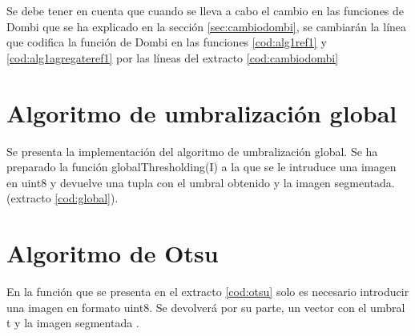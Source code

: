 \documentclass[main]{subfiles}
\begin{document}
\bgroup
{}
\egroup

\bgroup
{}
\egroup

\newpage

\bgroup
{}
\egroup

Se debe tener en cuenta que cuando se lleva a cabo el cambio en las funciones de Dombi que se ha explicado en la sección \ref{sec:cambiodombi}, se cambiarán la línea que codifica la función de Dombi en las funciones \ref{cod:alg1ref1} y \ref{cod:alg1agregateref1} por las líneas del extracto \ref{cod:cambiodombi}

\bgroup
{}
\egroup

\section{Algoritmo de umbralización global}
Se presenta la implementación del algoritmo de umbralización global. Se ha preparado la función {\ttfamily globalThresholding(I)} a la que se le intruduce una imagen en {\ttfamily uint8} y devuelve una tupla con el umbral obtenido y la imagen segmentada. (extracto \ref{cod:global}).

\bgroup
{}
\egroup

\section{Algoritmo de Otsu}
En la función que se presenta en el extracto \ref{cod:otsu} solo es necesario introducir una imagen en formato {\ttfamily uint8}. Se devolverá por su parte, un vector con el umbral {\ttfamily t} y la imagen segmentada \cite{art:otsu}.

\newpage

\bgroup
{}
\egroup
\end{document}
